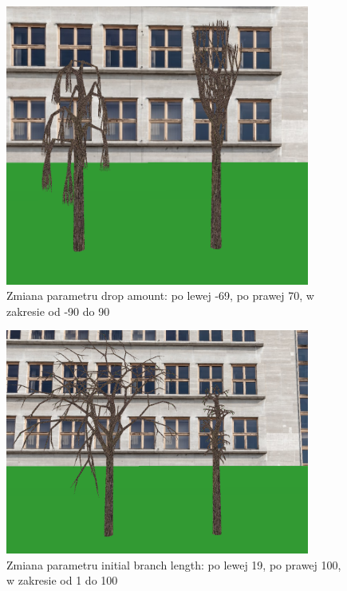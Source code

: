 \documentclass[a4paper,twoside,12pt]{report}
\begin{document}
\begin{figure}[H]
	\centering\includegraphics[width=10cm]{grafika/params/DropAmount.png}
	\caption{Zmiana parametru drop amount: po lewej -69, po prawej 70, w zakresie od -90 do 90}
    \label{fig:dropAmount}
\end{figure}

\begin{figure}[H]
	\centering\includegraphics[width=10cm]{grafika/params/InitBranchLen.png}
	\caption{Zmiana parametru initial branch length: po lewej 19, po prawej 100, w zakresie od 1 do 100}
    \label{fig:initBranchLen}
\end{figure}
\end{document}
